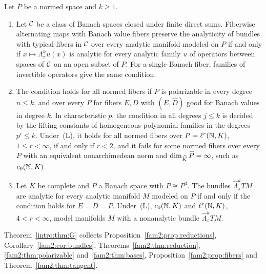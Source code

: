 \begin{introtheorem}\label{intro:thm:G}
Let $P$ be a normed space and $k\ge1$.
\begin{enumerate}
\item Let $\mathcal{C}$ be a class of Banach spaces closed under finite direct sums. Fiberwise alternating maps with Banach value
fibers preserve the analyticity of bundles with typical fibers in $\mathcal{C}$ over every analytic manifold modeled on $P$ if
and only if $x\mapsto\Lambda^k_\pi u(x)$ is analytic for every analytic family $u$ of operators between spaces of $\mathcal{C}$
on an open subset of $P$. For a single Banach fiber, families of invertible operators give the same condition.
\item The condition holds for all normed fibers if $P$ is polarizable in every degree $n\le k$, and over every $P$ for
fibers $E,D$ with $(E,\widehat D)$ good for Banach values in degree $k$. In characteristic $p$, the condition in all
degrees $j\le k$ is decided by the lifting constants of homogeneous polynomial families in the degrees $p^i\le k$.
Under~\textup{(L)}, it holds for all normed fibers over $P=\ell^r(\mathbb N,K)$, $1\le r<\infty$, if and only if $r<2$, and it
fails for some normed fibers over every $P$ with an equivalent nonarchimedean norm and $\dim_{\widehat K}\widehat P=\infty$,
such as $c_0(\mathbb N,K)$.
\item Let $K$ be complete and $P$ a Banach space with $P\cong P^3$. The bundles $\widehat\Lambda^k_\pi TM$ are analytic
for every analytic manifold $M$ modeled on $P$ if and only if the condition holds for $E=D=P$. Under~\textup{(L)},
$c_0(\mathbb N,K)$ and $\ell^r(\mathbb N,K)$, $4<r<\infty$, model manifolds $M$ with a nonanalytic bundle $\widehat\Lambda^k_\pi TM$.
\end{enumerate}
\end{introtheorem}

Theorem~\ref{intro:thm:G} collects Proposition~\ref{fam2:prop:reductions}, Corollary~\ref{fam2:cor:bundles},
Theorems~\ref{fam2:thm:reduction}, \ref{fam2:thm:polarizable} and~\ref{fam2:thm:bases},
Proposition~\ref{fam2:prop:fibers} and Theorem~\ref{fam2:thm:tangent}.

